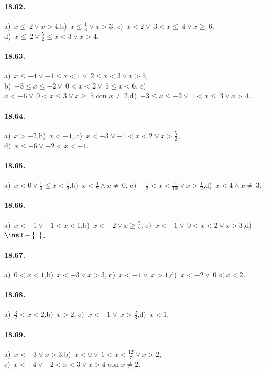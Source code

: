 \paragraph{18.62.} a)~$x\le~2\vee x>4$,\quad b)~$x\le \frac{1}{3}\vee x>3$,\quad
c)~$x<2\vee~3<x\le~4\vee x\ge~6$,\quad \protect\\ d)~$x\le~2\vee \frac{5}{2}\le x<3\vee x>4$.

\paragraph{18.63.} a)~$x\le -4\vee -1\le x<1\vee~2\le x<3\vee x>5$,\quad
\protect\\ b)~$-3\le x\le -2\vee~0<x<2\vee~5\le x<6$,\quad
c)~$x<-6\vee~0<x\le3\vee x\ge~5\text{ con }x\neq~2$,\quad d)~$-3\le x\le -2\vee~1<x\le~3\vee x>4$.

\paragraph{18.64.} a)~$x>-2$,\quad b)~$x<-1$,\quad
c)~$x<-3\vee -1<x<2\vee x>\frac{5}{2}$,\quad
\protect\\ d)~$x\le -6\vee -2<x<-1$.

\paragraph{18.65.} a)~$x<0\vee\frac{1}{4}\le x<\frac{1}{2}$,\quad b)~$x<\frac{1}{2}\wedge x\neq~0$,\quad
c)~$-\frac{1}{2}<x<\frac{1}{10}\vee x>\frac{1}{2}$,\quad d)~$x<4\wedge x\neq~3$.

\paragraph{18.66.} a)~$x<-1\vee -1<x<1$,\quad b)~$x<-2\vee x\ge \frac{5}{2}$,\quad
c)~$x<-1\vee~0<x<2\vee x>3$,\quad d)~$\insR-\{1\}$.

\paragraph{18.67.} a)~$0<x<1$,\quad b)~$x<-3\vee x>3$,\quad
c)~$x<-1\vee~x>1$,\quad d)~$x<-2 \vee~0<x<2$.

\paragraph{18.68.} a)~$\frac{3}{2}<x<2$,\quad b)~$x>2$,\quad
c)~$x<-1\vee~x>\frac{2}{3}$,\quad d)~$x<1$.

\paragraph{18.69.} a)~$x<-3\vee x>3$,\quad b)~$x<0\vee~1<x<\frac{12}{7}\vee x>2$,\quad
\protect\\ c)~$x<-4\vee -2<x<3\vee x>4\text{ con }x\neq2$.


